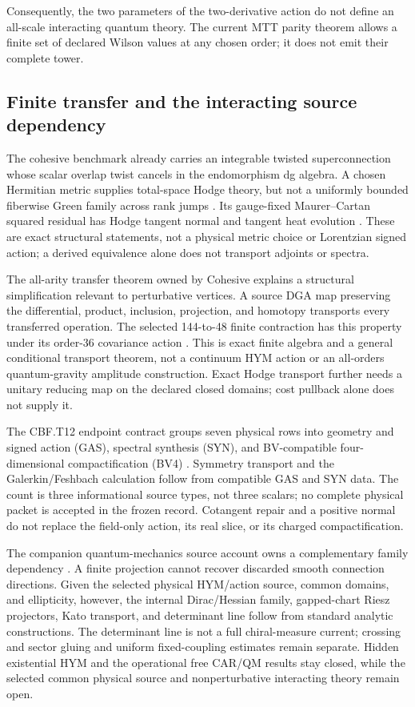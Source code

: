 \documentclass[11pt]{article}
\begin{document}
Consequently, the two parameters of the two-derivative action do not define
an all-scale interacting quantum theory. The current MTT parity theorem
allows a finite set of declared Wilson values at any chosen order; it does
not emit their complete tower.

\subsection{Finite transfer and the interacting source dependency}
\label{sec:consumer-transfer}

The cohesive benchmark already carries an integrable twisted superconnection
whose scalar overlap twist cancels in the endomorphism dg algebra. A chosen
Hermitian metric supplies total-space Hodge theory, but not a uniformly
bounded fiberwise Green family across rank jumps \cite{FrozenCohesive}.
Its gauge-fixed Maurer--Cartan squared residual has Hodge tangent normal and
tangent heat evolution \cite{FrozenCohesiveMC}. These are exact structural
statements, not a physical metric choice or Lorentzian signed action; a
derived equivalence alone does not transport adjoints or spectra.

The all-arity transfer theorem owned by Cohesive explains a structural
simplification relevant to perturbative vertices. A source DGA map preserving
the differential, product, inclusion, projection, and homotopy transports
every transferred operation. The selected 144-to-48 finite contraction has
this property under its order-36 covariance action
\cite{Cohesive14,FrozenAllArity}. This is exact finite algebra and a general
conditional transport theorem, not a continuum HYM action or an all-orders
quantum-gravity amplitude construction. Exact Hodge transport further needs
a unitary reducing map on the declared closed domains; cost pullback alone
does not supply it.

The CBF.T12 endpoint contract groups seven physical rows into geometry and
signed action (GAS), spectral synthesis (SYN), and BV-compatible
four-dimensional compactification (BV4) \cite{Cohesive14,FrozenEndpoint}.
Symmetry transport and the Galerkin/Feshbach calculation follow from compatible
GAS and SYN data. The count is three informational source types, not three
scalars; no complete physical packet is accepted in the frozen record.
Cotangent repair and a positive normal do not replace the field-only action,
its real slice, or its charged compactification.

The companion quantum-mechanics source account owns a complementary family
dependency \cite{FrozenFamily}. A finite projection cannot recover discarded
smooth connection directions. Given the selected physical HYM/action source,
common domains, and ellipticity, however, the internal Dirac/Hessian family,
gapped-chart Riesz projectors, Kato transport, and determinant line follow
from standard analytic constructions. The determinant line is not a full
chiral-measure current; crossing and sector gluing and uniform fixed-coupling
estimates remain separate. Hidden existential HYM and the operational free
CAR/QM results stay closed, while the selected common physical source and
nonperturbative interacting theory remain open.
\end{document}
